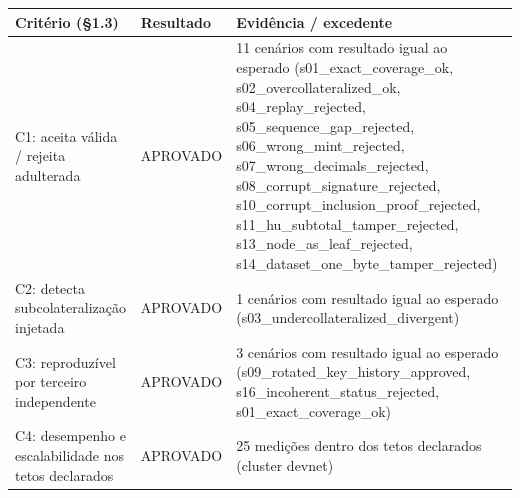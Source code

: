\begin{tabular}{p{5.5cm} l p{7cm}}
\toprule
\textbf{Critério (\S 1.3)} & \textbf{Resultado} & \textbf{Evidência / excedente} \\
\midrule
C1: aceita válida / rejeita adulterada & APROVADO & 11 cenários com resultado igual ao esperado (s01\_exact\_coverage\_ok, s02\_overcollateralized\_ok, s04\_replay\_rejected, s05\_sequence\_gap\_rejected, s06\_wrong\_mint\_rejected, s07\_wrong\_decimals\_rejected, s08\_corrupt\_signature\_rejected, s10\_corrupt\_inclusion\_proof\_rejected, s11\_hu\_subtotal\_tamper\_rejected, s13\_node\_as\_leaf\_rejected, s14\_dataset\_one\_byte\_tamper\_rejected) \\
C2: detecta subcolateralização injetada & APROVADO & 1 cenários com resultado igual ao esperado (s03\_undercollateralized\_divergent) \\
C3: reproduzível por terceiro independente & APROVADO & 3 cenários com resultado igual ao esperado (s09\_rotated\_key\_history\_approved, s16\_incoherent\_status\_rejected, s01\_exact\_coverage\_ok) \\
C4: desempenho e escalabilidade nos tetos declarados & APROVADO & 25 medições dentro dos tetos declarados (cluster devnet) \\
\bottomrule
\end{tabular}
